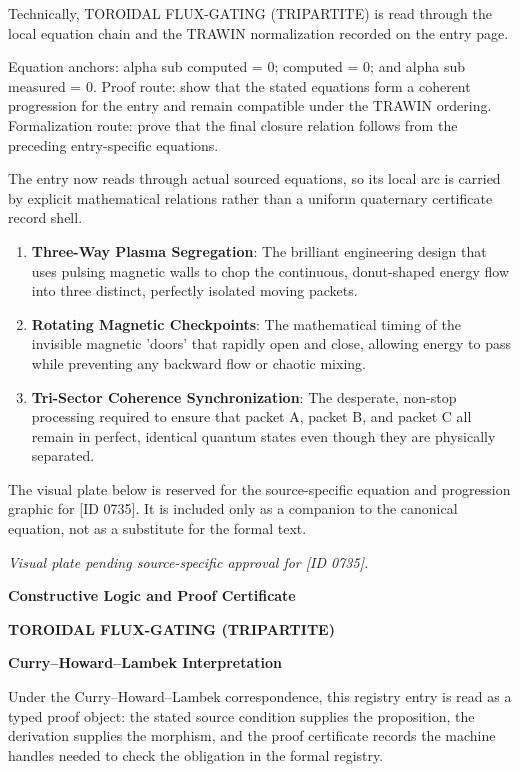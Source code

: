 Technically, TOROIDAL FLUX-GATING (TRIPARTITE) is read through the local equation chain and the TRAWIN normalization recorded on the entry page.

Equation anchors: alpha sub computed = 0; computed = 0; and alpha sub measured = 0. Proof route: show that the stated equations form a coherent progression for the entry and remain compatible under the TRAWIN ordering. Formalization route: prove that the final closure relation follows from the preceding entry-specific equations.

The entry now reads through actual sourced equations, so its local arc is carried by explicit mathematical relations rather than a uniform quaternary certificate record shell.
\endgroup

\begin{enumerate}[leftmargin=1.6em,itemsep=6pt,topsep=4pt]
\item \textbf{Three-Way Plasma Segregation}: The brilliant engineering design that uses pulsing magnetic walls to chop the continuous, donut-shaped energy flow into three distinct, perfectly isolated moving packets.
\item \textbf{Rotating Magnetic Checkpoints}: The mathematical timing of the invisible magnetic 'doors' that rapidly open and close, allowing energy to pass while preventing any backward flow or chaotic mixing.
\item \textbf{Tri-Sector Coherence Synchronization}: The desperate, non-stop processing required to ensure that packet A, packet B, and packet C all remain in perfect, identical quantum states even though they are physically separated.
\end{enumerate}

\begingroup\footnotesize\sloppy
The visual plate below is reserved for the source-specific equation and progression graphic for [ID 0735]. It is included only as a companion to the canonical equation, not as a substitute for the formal text.
\par\endgroup
\begingroup\footnotesize\itshape
Visual plate pending source-specific approval for [ID 0735].
\par\endgroup

\clearpage
\begingroup\tzpsupportsetup
\noindent\textbf{\fontsize{10.8pt}{12.8pt}\selectfont [ID 0735] Constructive Logic and Proof Certificate}\par
\noindent\textbf{\fontsize{10pt}{12pt}\selectfont TOROIDAL FLUX-GATING (TRIPARTITE)}\par
\vspace{0.45em}
\begingroup
\footnotesize
\setlength{\parskip}{0.22em}
\setlength{\parindent}{0pt}
\noindent\textbf{Curry--Howard--Lambek Interpretation}\par
Under the Curry--Howard--Lambek correspondence, this registry entry is read as a typed proof
object: the stated source condition supplies the proposition, the derivation supplies the
morphism, and the proof certificate records the machine handles needed to check the obligation
in the formal registry.

